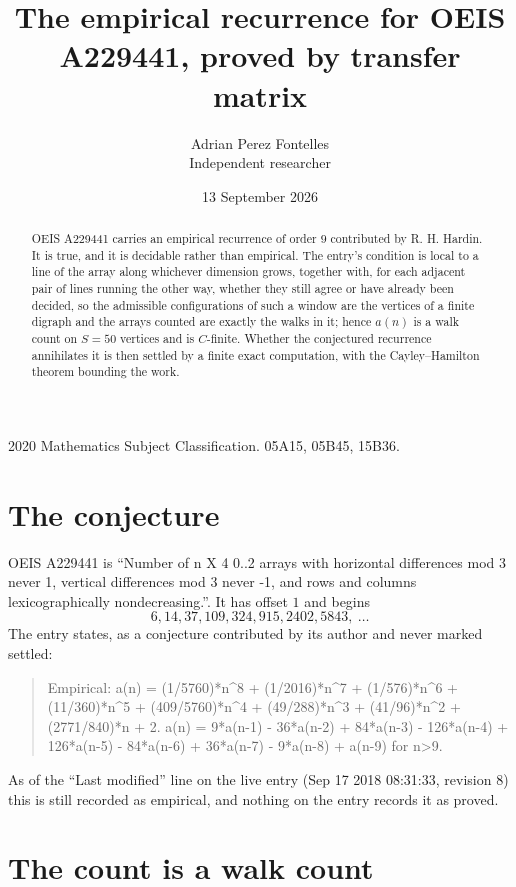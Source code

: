 \documentclass[11pt,a4paper]{article}
\title{The empirical recurrence for OEIS A229441, proved by transfer matrix}
\author{Adrian Perez Fontelles\\ \small Independent researcher}
\date{13 September 2026}
\theoremstyle{plain}
\theoremstyle{definition}
\begin{document}
\maketitle

\begin{abstract}
OEIS A229441 carries an empirical recurrence of order $9$ contributed by R. H. Hardin. It is
true, and it is decidable rather than empirical. The entry's condition is local to a line of the array along whichever dimension grows, together with, for each adjacent pair of lines running the other way, whether they still agree or have already been decided, so
the admissible configurations of such a window are the vertices of a finite digraph and the
arrays counted are exactly the walks in it; hence $a(n)$ is a walk count on $S=50$ vertices
and is $C$-finite. Whether the conjectured recurrence annihilates it is then settled by a
finite exact computation, with the Cayley--Hamilton theorem bounding the work.
\end{abstract}

\noindent\small 2020 Mathematics Subject Classification. 05A15, 05B45, 15B36.\normalsize

\section{The conjecture}

OEIS A229441 is ``Number of n X 4 0..2 arrays with horizontal differences mod 3 never 1, vertical differences mod 3 never -1, and rows and columns lexicographically nondecreasing.''. It has offset $1$ and begins
\[
6, 14, 37, 109, 324, 915, 2402, 5843,\ \dots
\]
The entry states, as a conjecture contributed by its author and never marked settled:
\begin{quote}
Empirical: a(n) = (1/5760)*n\^{}8 + (1/2016)*n\^{}7 + (1/576)*n\^{}6 + (11/360)*n\^{}5 + (409/5760)*n\^{}4 + (49/288)*n\^{}3 + (41/96)*n\^{}2 + (2771/840)*n + 2. a(n) = 9*a(n-1) - 36*a(n-2) + 84*a(n-3) - 126*a(n-4) + 126*a(n-5) - 84*a(n-6) + 36*a(n-7) - 9*a(n-8) + a(n-9) for n>9.
\end{quote}
As of the ``Last modified'' line on the live entry (Sep 17 2018 08:31:33, revision 8) this is still
recorded as empirical, and nothing on the entry records it as proved.

\section{The count is a walk count}
\end{document}
